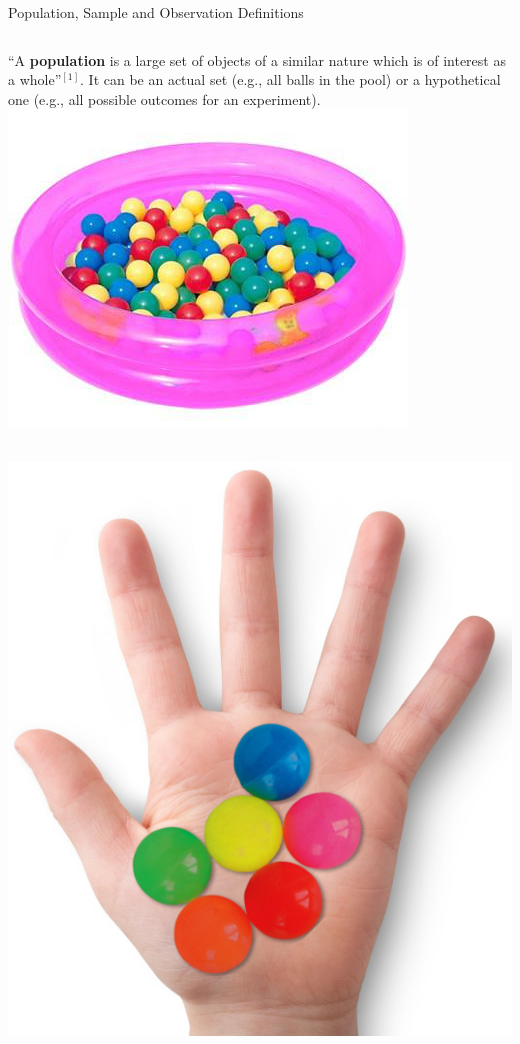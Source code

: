 \documentclass[t]{beamer}
\begin{document}
\begin{ftst}
{Population, Sample and Observation}
{Definitions}
\begin{columns}
``A \textbf{population} is a large set of objects of a similar nature which is of interest as a whole''$^{[1]}$. It can be an actual set (e.g., all balls in the pool) or a hypothetical one (e.g., all possible outcomes for an experiment).
\includegraphics[width=\textwidth]{../figs/ballpool.png}
\end{columns}
\vone
\begin{columns}
\includegraphics[width=\textwidth]{../figs/hand02.png}

\end{columns}
\end{ftst}
\end{document}

